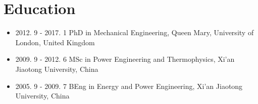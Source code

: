 \documentclass[letterpaper]{article}
\begin{document}
\vspace{-12pt}
\section*{Education}
\vspace{-10pt}
\begin{itemize}
  \item 2012. 9 - 2017. 1 \hspace{2pt} PhD in Mechanical Engineering, Queen Mary, University of London, United Kingdom
  \item 2009. 9 - 2012. 6 \hspace{2pt} MSc in Power Engineering and Thermophysics, Xi’an Jiaotong University, China
  \item 2005. 9 - 2009. 7 \hspace{2pt} BEng in Energy and Power Engineering, Xi’an Jiaotong University, China
\end{itemize}

\vspace{-12pt}
\end{document}

